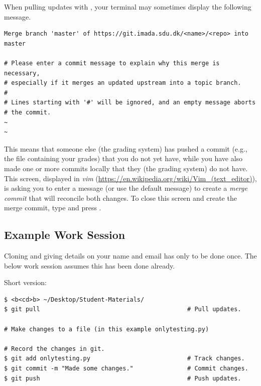 \begin{info}
When pulling updates with , your terminal may sometimes display the following message.
\begin{lstlisting}
Merge branch 'master' of https://git.imada.sdu.dk/<name>/<repo> into master

# Please enter a commit message to explain why this merge is necessary,
# especially if it merges an updated upstream into a topic branch.
#
# Lines starting with '#' will be ignored, and an empty message aborts
# the commit.
~
~
\end{lstlisting}
This means that someone else (the grading system) has pushed a commit
(e.g., the file containing your grades) that you do not yet have, while
you have also made one or more commits locally that they (the grading system) do not have.
This screen, displayed in \emph{vim} (\url{https://en.wikipedia.org/wiki/Vim_(text_editor)}), is asking you to enter a message (or use the default message) to create a \emph{merge commit} that will reconcile both changes.
To close this screen and create the merge commit, type  and press .
\end{info}


\subsection*{Example Work Session}
Cloning and giving details on your name and email has only to be done once. The below work session assumes this has been done already.

Short version:
\begin{lstlisting}
$ <b<cd>b> ~/Desktop/Student-Materials/
$ git pull                                         # Pull updates.

# Make changes to a file (in this example onlytesting.py)

# Record the changes in git.
$ git add onlytesting.py                           # Track changes.
$ git commit -m "Made some changes."               # Commit changes.
$ git push                                         # Push updates.
\end{lstlisting}

